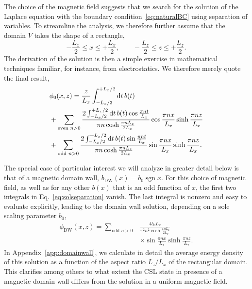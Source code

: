 \documentclass[pdflatex,iicol,sn-mathphys-num]{sn-jnl}
\let\p=\phi
\newcommand{\dd}{\text{d}}%
\newcommand{\bmag}{b}%
\begin{document}
The choice of the magnetic field suggests that we search for the solution of the Laplace equation with the boundary condition~\eqref{eq:naturalBC} using separation of variables. To streamline the analysis, we therefore further assume that the domain $V$ takes the shape of a rectangle,
\begin{equation}
-\frac{L_x}2\leq x\leq+\frac{L_x}2,\qquad
-\frac{L_z}2\leq z\leq+\frac{L_z}2.
\label{eq:rectangle}
\end{equation}
The derivation of the solution is then a simple exercise in mathematical techniques familiar, for instance, from electrostatics. We therefore merely quote the final result,
\begin{align}
\label{eq:solseparation}
&\p_0(x,z)=\frac{z}{L_x}\int_{-{L_x}/2}^{+{L_x}/2}\dd t\,\bmag(t)\\
\notag
&+\sum_{\text{even }n>0}\frac{2\int_{-{L_x}/2}^{+{L_x}/2}\dd t\,\bmag(t)\cos\frac{\pi nt}{L_x}}{\pi n\cosh\frac{\pi nL_z}{2L_x}}\cos\frac{\pi nx}{L_x}\sinh\frac{\pi nz}{L_x}\\
\notag
&+\sum_{\text{odd }n>0}\frac{2\int_{-{L_x}/2}^{+{L_x}/2}\dd t\,\bmag(t)\sin\frac{\pi nt}{L_x}}{\pi n\cosh\frac{\pi nL_z}{2L_x}}\sin\frac{\pi nx}{L_x}\sinh\frac{\pi nz}{L_x}.
\end{align}

The special case of particular interest we will analyze in greater detail below is that of a magnetic domain wall, $\bmag_\text{DW}(x)=\bmag_0\operatorname{sgn}x$. For this choice of magnetic field, as well as for any other $\bmag(x)$ that is an odd function of $x$, the first two integrals in Eq.~\eqref{eq:solseparation} vanish. The last integral is nonzero and easy to evaluate explicitly, leading to the domain wall solution, depending on a sole scaling parameter $\bmag_0$,
\begin{equation}
\begin{split}
\p_{\text{DW}}(x,z)=\sum_{\text{odd }n>0}&\frac{4\bmag_0L_x}{\pi^2n^2\cosh\frac{\pi nL_z}{2L_x}}\\
&\times\sin\frac{\pi nx}{L_x}\sinh\frac{\pi nz}{L_x}.
\end{split}
\label{eq:DWsolution}
\end{equation}
In Appendix~\ref{app:domainwall}, we calculate in detail the average energy density of this solution as a function of the aspect ratio $L_z/L_x$ of the rectangular domain. This clarifies among others to what extent the CSL state in presence of a magnetic domain wall differs from the solution in a uniform magnetic field.
\end{document}
